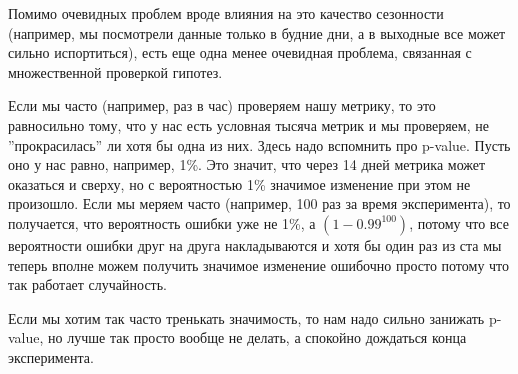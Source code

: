 Помимо очевидных проблем вроде влияния на это качество сезонности (например, мы посмотрели данные только в будние дни, а в выходные все может сильно испортиться), есть еще одна менее очевидная проблема, связанная с множественной проверкой гипотез. 

Если мы часто (например, раз в час) проверяем нашу метрику, то это равносильно тому, что у нас есть условная тысяча метрик и мы проверяем, не ''прокрасилась'' ли хотя бы одна из них. Здесь надо вспомнить про \mbox{p-value}. Пусть оно у нас равно, например, 1\%. Это значит, что через 14 дней метрика может оказаться и сверху, но с вероятностью 1\% значимое изменение при этом не произошло. Если мы меряем часто (например, 100 раз за время эксперимента), то получается, что вероятность ошибки уже не 1\%, а $(1 - 0.99^{100})$, потому что все вероятности ошибки друг на друга накладываются и хотя бы один раз из ста мы теперь вполне можем получить значимое изменение ошибочно просто потому что так работает случайность.

Если мы хотим так часто тренькать значимость, то нам надо сильно занижать p-value, но лучше так просто вообще не делать, а спокойно дождаться конца эксперимента.
